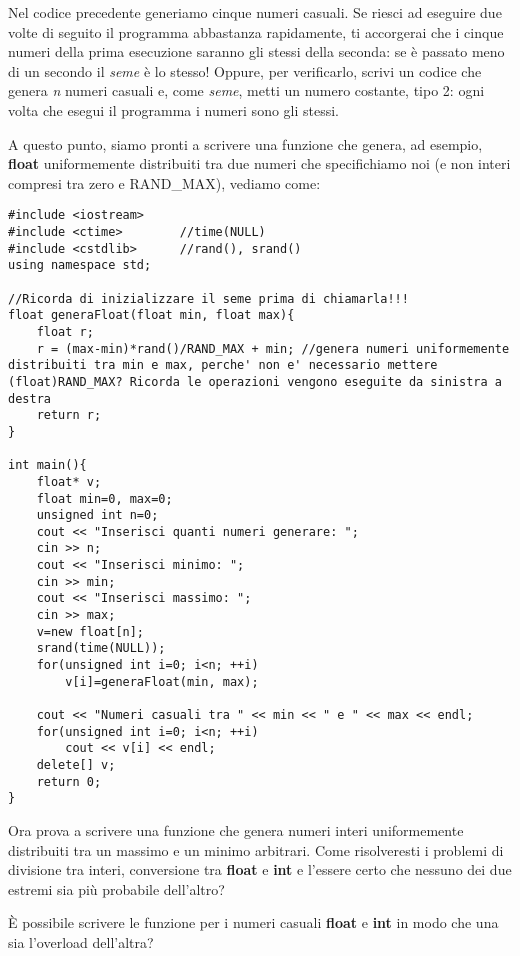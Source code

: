 Nel codice precedente generiamo cinque numeri casuali. Se riesci ad eseguire due volte di seguito il programma abbastanza rapidamente, ti accorgerai che i cinque numeri della prima esecuzione saranno gli stessi della seconda: se è passato meno di un secondo il \emph{seme} è lo stesso! Oppure, per verificarlo, scrivi un codice che genera \emph{n} numeri casuali e, come \emph{seme}, metti un numero costante, tipo 2: ogni volta che esegui il programma i numeri sono gli stessi.
 
A questo punto, siamo pronti a scrivere una funzione che genera, ad esempio, \textbf{float} uniformemente distribuiti tra due numeri che specifichiamo noi (e non interi compresi tra zero e RAND\_MAX), vediamo come:
\begin{lstlisting}
#include <iostream>
#include <ctime>		//time(NULL)
#include <cstdlib>		//rand(), srand()
using namespace std;

//Ricorda di inizializzare il seme prima di chiamarla!!!
float generaFloat(float min, float max){
	float r;
	r = (max-min)*rand()/RAND_MAX + min; //genera numeri uniformemente distribuiti tra min e max, perche' non e' necessario mettere (float)RAND_MAX? Ricorda le operazioni vengono eseguite da sinistra a destra
	return r;
}

int main(){
	float* v;
	float min=0, max=0;
	unsigned int n=0;
	cout << "Inserisci quanti numeri generare: ";
	cin >> n;
	cout << "Inserisci minimo: ";
	cin >> min;
	cout << "Inserisci massimo: "; 
	cin >> max;
	v=new float[n];
	srand(time(NULL));
	for(unsigned int i=0; i<n; ++i)
		v[i]=generaFloat(min, max);
	
	cout << "Numeri casuali tra " << min << " e " << max << endl;
	for(unsigned int i=0; i<n; ++i)
		cout << v[i] << endl;
	delete[] v;
	return 0;
}
\end{lstlisting}

Ora prova a scrivere una funzione che genera numeri interi uniformemente distribuiti tra un massimo e un minimo arbitrari. Come risolveresti i problemi di divisione tra interi, conversione tra \textbf{float} e \textbf{int} e l'essere certo che nessuno dei due estremi sia più probabile dell'altro? 

È possibile scrivere le funzione per i numeri casuali \textbf{float} e \textbf{int} in modo che una sia l'overload dell'altra?\\


